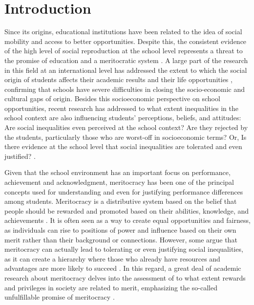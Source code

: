 \documentclass[
    behavsci,
    article,
    submit,
moreauthors
]{mdpi}
\begin{document}
\section{Introduction}\label{introduction}

Since its origins, educational institutions have been related to the
idea of social mobility and access to better opportunities. Despite
this, the consistent evidence of the high level of social reproduction
at the school level represents a threat to the promise of education and
a meritocratic system \citep{bourdieu_reproduction_1990}. A large part
of the research in this field at an international level has addressed
the extent to which the social origin of students affects their academic
results and their life opportunities \citep{vonhippel_test_2019},
confirming that schools have severe difficulties in closing the
socio-economic and cultural gaps of origin. Besides this socioeconomic
perspective on school opportunities, recent research has addressed to
what extent inequalities in the school context are also influencing
students' perceptions, beliefs, and attitudes: Are social inequalities
even perceived at the school context? Are they rejected by the students,
particularly those who are worst-off in socioeconomic terms? Or, Is
there evidence at the school level that social inequalities are
tolerated and even justified?
\citep{batruch_belief_2022, wiederkehr_belief_2015}.

Given that the school environment has an important focus on performance,
achievement and acknowledgment, meritocracy has been one of the
principal concepts used for understanding and even for justifying
performance differences among students. Meritocracy is a distributive
system based on the belief that people should be rewarded and promoted
based on their abilities, knowledge, and achievements
\citep{young_rise_1958}. It is often seen as a way to create equal
opportunities and fairness, as individuals can rise to positions of
power and influence based on their own merit rather than their
background or connections. However, some argue that meritocracy can
actually lead to tolerating or even justifying social inequalities, as
it can create a hierarchy where those who already have resources and
advantages are more likely to succeed
\citep{sandel_tyranny_2020, mcnamee_meritocracy_2004}. In this regard, a
great deal of academic research about meritocracy delves into the
assessment of to what extent rewards and privileges in society are
related to merit, emphasizing the so-called unfulfillable promise of
meritocracy \citep{mijs_stratified_2016}.
\end{document}
